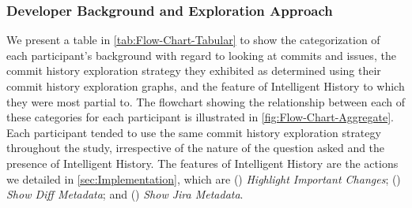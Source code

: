 \subsubsection{Developer Background and Exploration Approach}

We present a table in \autoref{tab:Flow-Chart-Tabular} to show the
categorization of each participant's background with regard to looking at commits
and issues, the commit history exploration strategy they exhibited as determined
using their commit history exploration graphs, and the feature of Intelligent History
to which they were most partial to.
The flowchart showing the relationship between each of these categories for each participant
is illustrated in \autoref{fig:Flow-Chart-Aggregate}.
Each participant tended to use the same commit history exploration strategy throughout the study, 
irrespective of the nature of the question asked and the presence of Intelligent History.
The features of Intelligent History are the actions we detailed in \autoref{sec:Implementation}, which are 
() \textit{Highlight Important Changes}; 
() \textit{Show Diff Metadata}; 
and () \textit{Show Jira Metadata}.

